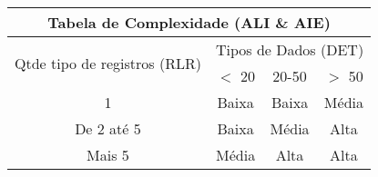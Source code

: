 \documentclass[12pt]{article}
\title{}
\author{}
\begin{document}
\maketitle

\begin{abstract}

\end{abstract}

\section{}
\begin{tabular}{|c|c|c|c|}
\hline
\multicolumn{4}{|c|}{Tabela de Complexidade (ALI \& AIE)} \\
\hline
\multirow{2}{*}{Qtde tipo de registros (RLR)} & \multicolumn{3}{|c|}{Tipos de Dados (DET)} \\
& $<$ 20  & 20-50 & $>$ 50 \\ 
\hline
1 & Baixa & Baixa & Média \\
\hline
De 2 até 5 & Baixa & Média & Alta \\
\hline
Mais 5 & Média & Alta & Alta \\
\hline

\end{tabular}
\end{document}
